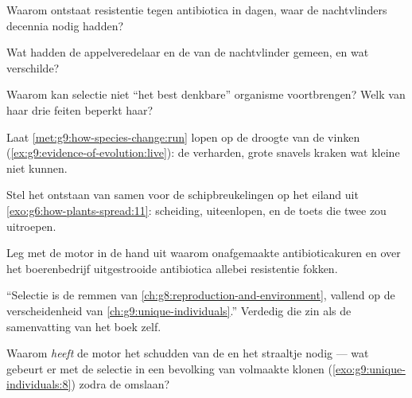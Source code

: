 \begin{exercise}[$\star$]\label{exo:g9:how-species-change:5}
Waarom ontstaat resistentie tegen antibiotica in dagen, waar de
nachtvlinders decennia nodig hadden?
\end{exercise}

\begin{exercise}[$\star$]\label{exo:g9:how-species-change:6}
Wat hadden de appelveredelaar en de  van de nachtvlinder
gemeen, en wat verschilde?
\end{exercise}

\begin{exercise}[$\star\star$]\label{exo:g9:how-species-change:7}
Waarom kan selectie niet ``het best denkbare'' organisme
voortbrengen? Welk van haar drie feiten beperkt haar?
\end{exercise}

\begin{exercise}[$\star\star$]\label{exo:g9:how-species-change:8}
Laat \cref{met:g9:how-species-change:run} lopen op de droogte van
de vinken (\cref{ex:g9:evidence-of-evolution:live}): de 
verharden, grote snavels kraken wat kleine niet kunnen.
\end{exercise}

\begin{exercise}[$\star\star$]\label{exo:g9:how-species-change:9}
Stel het ontstaan van  samen voor de schipbreukelingen op
het eiland uit \cref{exo:g6:how-plants-spread:11}: scheiding,
uiteenlopen, en de toets die twee  zou uitroepen.
\end{exercise}

\begin{exercise}[$\star\star$]\label{exo:g9:how-species-change:10}
Leg met de motor in de hand uit waarom onafgemaakte
antibioticakuren en over het boerenbedrijf uitgestrooide
antibiotica allebei resistentie fokken.
\end{exercise}

\begin{exercise}[$\star\star$]\label{exo:g9:how-species-change:11}
``Selectie is de remmen van
\cref{ch:g8:reproduction-and-environment}, vallend op de
verscheidenheid van \cref{ch:g9:unique-individuals}.'' Verdedig die
zin als de samenvatting van het boek zelf.
\end{exercise}

\begin{exercise}[$\star\star\star$]\label{exo:g9:how-species-change:12}
Waarom \emph{heeft} de motor het schudden van de  en het straaltje  nodig --- wat gebeurt er
met de selectie in een bevolking van volmaakte klonen
(\cref{exo:g9:unique-individuals:8}) zodra de 
omslaan?
\end{exercise}


